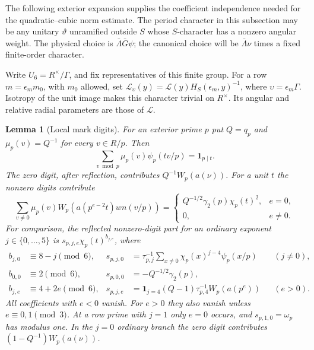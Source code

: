 \documentclass[11pt,a4paper]{article}
\numberwithin{equation}{section}
\newtheorem{lemma}[theorem]{Lemma}
\theoremstyle{definition}
\theoremstyle{remark}
\newcommand{\ind}{\mathbf 1}
\begin{document}
The following exterior expansion supplies the coefficient independence
needed for the quadratic--cubic norm estimate.  The period character in this subsection
may be any unitary $\vartheta$ unramified outside $S$ whose $S$-character
has a nonzero angular weight.  The physical choice is
$\bar\Lambda\bar G\psi$; the canonical choice will be
$\bar\Lambda\nu$ times a fixed finite-order character.

Write $U_6=R^\times/\Gamma$, and fix representatives of this finite group.
For a row $m=\epsilon_m m_0$, with $m_0$ allowed, set
$\mathcal L_\upsilon(y)=\mathcal L(y)H_S(\epsilon_m,y)^{-1}$,
where $\upsilon=\epsilon_m\Gamma$.  Isotropy of the unit image makes
this character trivial on $R^\times$.  Its angular and relative radial
parameters are those of $\mathcal L$.

\begin{lemma}[Local mark digits]\label{lem:mark-digits}
For an exterior prime $p$ put $Q=q_p$ and
$\mu_p(v)=Q^{-1}$ for every $v\in R/p$.  Then
\[
 \sum_{v\bmod p}\mu_p(v)\psi_p(tv/p)=\ind_{p\mid t}.
\]
The zero digit, after reflection, contributes $Q^{-1}W_p(a(\nu))$.
For a unit $t$ the nonzero digits contribute
\begin{equation}\label{eq:mark-active-local}
 \sum_{v\ne0}\mu_p(v)W_p(a(p^{e-2}t)wn(v/p))
 =\begin{cases}
 Q^{-1/2}\gamma_2(p)\chi_p(t)^2,&e=0,\\
 0,&e\ne0.
 \end{cases}
\end{equation}
For comparison, the reflected nonzero-digit part for an ordinary exponent
$j\in\{0,\ldots,5\}$ is $s_{p,j,e}\chi_p(t)^{b_{j,e}}$, where
\begin{equation}\label{eq:can-weyl-table}
 \begin{aligned}
 b_{j,0}&\equiv8-j\pmod6,&
 s_{p,j,0}&=\tau_{p,j}^{-1}
       \sum_{x\ne0}\chi_p(x)^{j-4}\psi_p(x/p) &&(j\ne0),\\
 b_{0,0}&\equiv2\pmod6,&
 s_{p,0,0}&=-Q^{-1/2}\gamma_2(p),\\
 b_{j,e}&\equiv4+2e\pmod6,&
 s_{p,j,e}&=\ind_{j=4}(Q-1)\tau_{p,4}^{-1}W_p(a(p^e)) &&(e>0).
 \end{aligned}
\end{equation}
All coefficients with $e<0$ vanish.  For $e>0$ they also vanish unless
$e\equiv0,1\pmod3$.  At a row prime with $j=1$ only $e=0$ occurs,
and $s_{p,1,0}=\omega_p$ has modulus one.  In the $j=0$ ordinary
branch the zero digit contributes $(1-Q^{-1})W_p(a(\nu))$.
\end{lemma}
\end{document}
